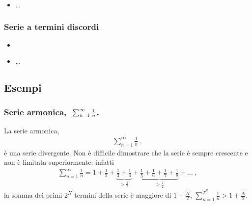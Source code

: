 \documentclass[letterpaper,10pt,english]{jupyterBook}
\begin{document}
\sphinxAtStartPar
{}

\sphinxAtStartPar
{}
\begin{itemize}
\item {} 
\sphinxAtStartPar
…

\end{itemize}

\sphinxAtStartPar
{}


\subsubsection{Serie a termini discordi}
\label{\detokenize{ch/series:serie-a-termini-discordi}}\begin{itemize}
\item {} 
\sphinxAtStartPar
{}

\item {} 
\sphinxAtStartPar
…

\end{itemize}


\subsection{Esempi}
\label{\detokenize{ch/series:esempi}}\subsubsection*{Serie armonica, \protect\(\ \sum_{n=1}^{\infty} \frac{1}{n}\protect\).}

\sphinxAtStartPar
La serie armonica,
\begin{equation*}
\begin{split}\sum_{n=1}^{\infty} \frac{1}{n} \ ,\end{split}
\end{equation*}
\sphinxAtStartPar
è una serie divergente. Non è difficile dimostrare che la serie è sempre crescente e non è limitata superiormente: infatti
\begin{equation*}
\begin{split}\sum_{n=1}^{\infty} \frac{1}{n} = 1 + \frac{1}{2} + \underbrace{\frac{1}{3} + \frac{1}{4}}_{> \frac{1}{2}} + \underbrace{\frac{1}{5} + \frac{1}{6} + \frac{1}{7} + \frac{1}{8}}_{> \frac{1}{2}} + \dots \ ,\end{split}
\end{equation*}
\sphinxAtStartPar
la somma dei primi \(2^N\) termini della serie è maggiore di \(1 + \frac{N}{2}\), \(\sum_{n=1}^{2^N} \frac{1}{n} > 1 + \frac{N}{2}\).
\end{document}
